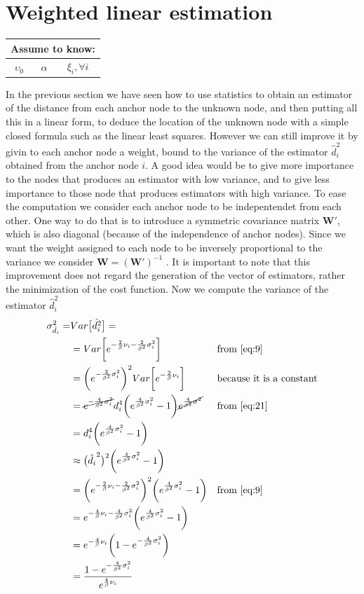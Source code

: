 \documentclass[12pt]{report}
\begin{document}
\section{Weighted linear estimation}
\begin{center}
    \begin{tabular}{ |c|c|c| } 
    \hline
    \multicolumn{3}{|c|}{ \textbf{Assume to know:} } \\
    \hline
    $\upsilon_0$ & $\alpha$ & $\xi_i,\forall i$\\
    \hline
    \end{tabular}
\end{center}    
In the previous section we have seen how to use statistics to obtain an estimator of the distance from each anchor node to the unknown node, and then putting all this in a linear form, to deduce the location of the unknown node with a simple closed formula such as the linear least squares. However we can still improve it by givin to each anchor node a weight, bound to the variance of the estimator $\hat{d}_i^2$ obtained from the anchor node $i$. A good idea would be to give more importance to the nodes that produces an estimator with low variance, and to give less importance to those node that produces estimators with high variance. To ease the computation we consider each anchor node to be indepentendet from each other. One way to do that is to introduce a symmetric covariance matrix $\mathbf{W}'$, which is also diagonal (because of the independence of anchor nodes). Since we want the weight assigned to each node to be inversely proportional to the variance we consider $\mathbf{W}=(\mathbf{W}')^{-1}$ \cite{rzk,899498y4hd}. It is important to note that this improvement does not regard the generation of the vector of estimators, rather the minimization of the cost function. Now we compute the variance of the estimator $\hat{d}_i^2$
\begin{align}
\sigma^2_{\hat{d_i}}=&Var\big[\hat{d_i^2}\big]=&& \\
&=Var\bigg[e^{-\frac{2}{\beta}\nu_i-\frac{2}{\beta^2}\sigma^2_i}\bigg] && \text{from \eqref{eq:9}}\\
&=\bigg(e^{-\frac{2}{\beta^2}\sigma^2_i}\bigg)^2Var\bigg[e^{-\frac{2}{\beta}\nu_i}\bigg]&& \text{because it is a constant}\\
&=\cancel{e^{-\frac{4}{\beta^2}\sigma^2_i}}d_i^4\bigg(e^{\frac{4}{\beta^2}\sigma_i^2}-1\bigg)\cancel{e^{\frac{4}{\beta^2}\sigma^2}} &&\text{from } \eqref{eq:21}\\
&=d_i^4\bigg(e^{\frac{4}{\beta^2}\sigma_i^2}-1\bigg)\\
&\approx \big(\hat{d_i}^2\big)^2\bigg(e^{\frac{4}{\beta^2}\sigma_i^2}-1\bigg)\\
&=\bigg(e^{-\frac{2}{\beta}\nu_i-\frac{2}{\beta^2}\sigma^2_i}\bigg)^2\bigg(e^{\frac{4}{\beta^2}\sigma_i^2}-1\bigg)&&\text{from }\eqref{eq:9}\\
&=e^{-\frac{4}{\beta}\nu_i-\frac{4}{\beta^2}\sigma^2_i}\bigg(e^{\frac{4}{\beta^2}\sigma^2_i}-1\bigg)\\
&=e^{-\frac{4}{\beta}\nu_i}\bigg(1-e^{-\frac{4}{\beta^2}\sigma^2_i}\bigg)\\
&=\frac{1-e^{-\frac{4}{\beta^2}\sigma^2_i}}{e^{\frac{4}{\beta}\nu_i}}
\end{align}
\end{document}
